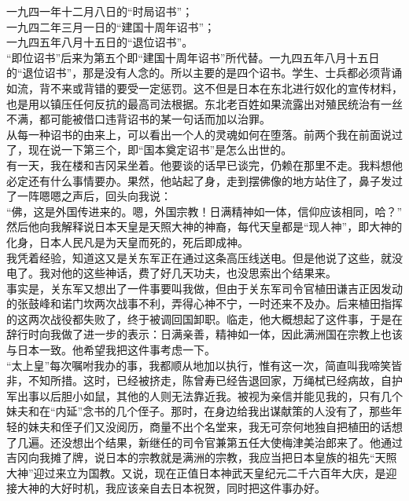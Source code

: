 一九四一年十二月八日的“时局诏书”；\\

一九四二年三月一日的“建国十周年诏书”；\\

一九四五年八月十五日的“退位诏书”。\\

“即位诏书”后来为第五个即“建国十周年诏书”所代替。一九四五年八月十五日的“退位诏书”，那是没有人念的。所以主要的是四个诏书。学生、士兵都必须背诵如流，背不来或背错的要受一定惩罚。这不但是日本在东北进行奴化的宣传材料，也是用以镇压任何反抗的最高司法根据。东北老百姓如果流露出对殖民统治有一丝不满，都可能被借口违背诏书的某一句话而加以治罪。\\

从每一种诏书的由来上，可以看出一个人的灵魂如何在堕落。前两个我在前面说过了，现在说一下第三个，即“国本奠定诏书”是怎么出世的。\\

有一天，我在楼和吉冈呆坐着。他要谈的话早已谈完，仍赖在那里不走。我料想他必定还有什么事情要办。果然，他站起了身，走到摆佛像的地方站住了，鼻子发过了一阵嗯嗯之声后，回头向我说：\\

“佛，这是外国传进来的。嗯，外国宗教！日满精神如一体，信仰应该相同，哈？”\\

然后他向我解释说日本天皇是天照大神的神裔，每代天皇都是“现人神”，即大神的化身，日本人民凡是为天皇而死的，死后即成神。\\

我凭着经验，知道这又是关东军正在通过这条高压线送电。但是他说了这些，就没电了。我对他的这些神话，费了好几天功夫，也没思索出个结果来。\\

事实是，关东军又想出了一件事要叫我做，但由于关东军司令官植田谦吉正因发动的张鼓峰和诺门坎两次战事不利，弄得心神不宁，一时还来不及办。后来植田指挥的这两次战役都失败了，终于被调回国卸职。临走，他大概想起了这件事，于是在辞行时向我做了进一步的表示：日满亲善，精神如一体，因此满洲国在宗教上也该与日本一致。他希望我把这件事考虑一下。\\

“太上皇”每次嘱咐我办的事，我都顺从地加以执行，惟有这一次，简直叫我啼笑皆非，不知所措。这时，已经被挤走，陈曾寿已经告退回家，万绳栻已经病故，自护军出事以后胆小如鼠，其他的人则无法靠近我。被视为亲信并能见我的，只有几个妹夫和在“内延”念书的几个侄子。那时，在身边给我出谋献策的人没有了，那些年轻的妹夫和侄子们又没阅历，商量不出个名堂来，我无可奈何地独自把植田的话想了几遍。还没想出个结果，新继任的司令官兼第五任大使梅津美治郎来了。他通过吉冈向我摊了牌，说日本的宗教就是满洲的宗教，我应当把日本皇族的祖先“天照大神”迎过来立为国教。又说，现在正值日本神武天皇纪元二千六百年大庆，是迎接大神的大好时机，我应该亲自去日本祝贺，同时把这件事办好。\\


